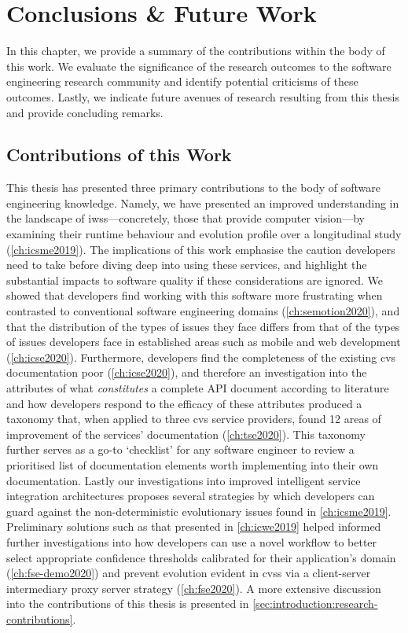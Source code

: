 \chapter{Conclusions \& Future Work}
\label{ch:conclusions}

In this chapter, we provide a summary of the contributions within the body of this work. We evaluate the significance of the research outcomes to the software engineering research community and identify potential criticisms of these outcomes. Lastly, we indicate future avenues of research resulting from this thesis and provide concluding remarks.

\section{Contributions of this Work}

This thesis has presented three primary contributions to the body of software engineering knowledge. Namely, we have presented an improved understanding in the landscape of \glspl{iws}---concretely, those that provide computer vision---by examining their runtime behaviour and evolution profile over a longitudinal study (\cref{ch:icsme2019}). The implications of this work emphasise the caution developers need to take before diving deep into using these services, and highlight the substantial impacts to software quality if these considerations are ignored. We showed that developers find working with this software more frustrating when contrasted to conventional software engineering domains (\cref{ch:semotion2020}), and that the distribution of the types of issues they face differs from that of the types of issues developers face in established areas such as mobile and web development (\cref{ch:icse2020}). Furthermore, developers find the completeness of the existing \gls{cvs}  documentation poor (\cref{ch:icse2020}), and therefore an investigation into the attributes of what \textit{constitutes} a complete API document according to literature and how developers respond to the efficacy of these attributes produced a taxonomy that, when applied to three \gls{cvs} service providers, found 12 areas of improvement of the services' documentation (\cref{ch:tse2020}). This taxonomy further serves as a go-to `checklist' for any software engineer to review a prioritised list of documentation elements worth implementing into their own  documentation. Lastly our investigations into improved intelligent service integration architectures proposes several strategies by which developers can guard against the non-deterministic evolutionary issues found in \cref{ch:icsme2019}. Preliminary solutions such as that presented in \cref{ch:icwe2019} helped informed further investigations into how developers can use a novel workflow to better select appropriate confidence thresholds calibrated for their application's domain (\cref{ch:fse-demo2020}) and prevent evolution evident in \glspl{cvs} via a client-server intermediary proxy server strategy (\cref{ch:fse2020}). A more extensive discussion into the contributions of this thesis is presented in \cref{sec:introduction:research-contributions}.

